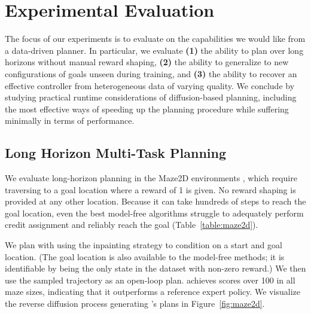 \section{Experimental Evaluation}
\label{sec:experiments}

The focus of our experiments is to evaluate \method on the capabilities we would like from a data-driven planner.
In particular, we evaluate
\textbf{(1)} the ability to plan over long horizons without manual reward shaping,
\textbf{(2)} the ability to generalize to new configurations of goals unseen during training, and
\textbf{(3)} the ability to recover an effective controller from heterogeneous data of varying quality.
We conclude by studying practical runtime considerations of diffusion-based planning, including the most effective ways of speeding up the planning procedure while suffering minimally in terms of performance.

\subsection{Long Horizon Multi-Task Planning}
\label{sec:maze2d}

We evaluate long-horizon planning in the Maze2D environments \citep{fu2020d4rl}, which require traversing to a goal location where a reward of 1 is given.
No reward shaping is provided at any other location.
Because it can take hundreds of steps to reach the goal location, 
even the best model-free algorithms struggle to adequately perform credit assignment and reliably reach the goal (Table~\ref{table:maze2d}).

We plan with \method using the inpainting strategy to condition on a start and goal location.
(The goal location is also available to the model-free methods; it is identifiable by being the only state in the dataset with non-zero reward.)
We then use the sampled trajectory as an open-loop plan.
\method achieves scores over 100 in all maze sizes, indicating that it outperforms a reference expert policy.
We visualize the reverse diffusion process generating \method's plans in Figure~\ref{fig:maze2d}.

